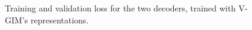 \begin{figure}[h]
  \centering
  \begin{minipage}[b]{0.45\linewidth}
    \centering
    
    \label{fig:loss-intermediate}
  \end{minipage}
  \hfill
  \begin{minipage}[b]{0.45\linewidth}
    \centering
    
    \label{fig:loss-final}
  \end{minipage}
  \caption{Training and validation loss for the two decoders, trained with V-GIM's representations.}
  \label{fig:decoder_loss_functions}
\end{figure}
